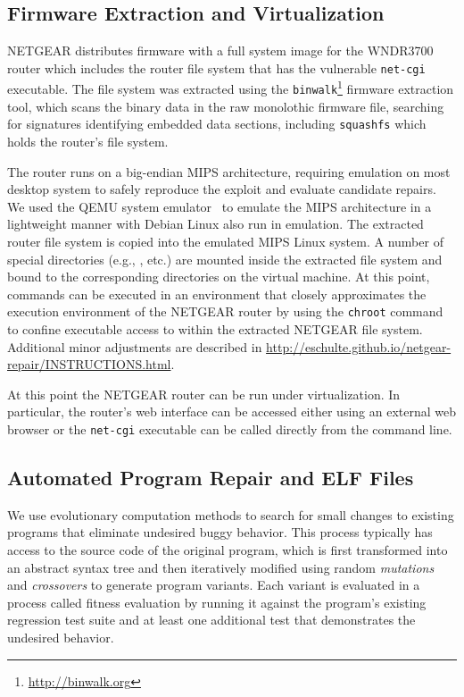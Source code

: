 \documentclass{sigcomm-alternate}
\begin{document}
\subsection{Firmware Extraction and Virtualization}
\label{sec-3-1}
NETGEAR distributes firmware with a full system image for the
WNDR3700 router which includes the router file system that has the
vulnerable \texttt{net-cgi} executable. 
The file system was extracted using the 
\texttt{binwalk}\footnote{\url{http://binwalk.org}} firmware extraction
tool, which scans the binary data in the raw monolothic firmware file,
searching for signatures
identifying embedded data sections,
including {\tt squashfs}\cite{lougher2006squashfs} which
holds the router's file system.

The router runs on a big-endian MIPS architecture, requiring emulation
on most desktop system to safely reproduce the exploit and evaluate
candidate repairs. We used the QEMU system
emulator~\cite{bellard2005qemu} to emulate the MIPS architecture in a
lightweight manner with Debian Linux also run in
emulation.  The extracted router file system is copied into the
emulated MIPS Linux system.  A number of special directories (e.g.,
,  etc.) are mounted inside the extracted
file system and bound to the corresponding directories on the virtual
machine.  At this point, commands can be executed in an environment
that closely approximates the execution environment of the NETGEAR
router by using the \texttt{chroot} command to confine executable access
to within the extracted NETGEAR file system. Additional minor
adjustments are described in \url{http://eschulte.github.io/netgear-repair/INSTRUCTIONS.html}.

At this point the NETGEAR router can be run under virtualization.  In
particular, the router's web interface can be accessed either using an
external web browser or the \texttt{net-cgi} executable can be called
directly from the command line.

\subsection{Automated Program Repair and ELF Files}
\label{sec-3-2}

We use evolutionary computation methods
\cite{forrest2009genetic,genprog-tse-journal,le2012representations,legoues2011systematicstudy}
to search for small changes to existing programs that eliminate
undesired buggy behavior.  This process typically has access to the
source code of the original program, which is first transformed into
an abstract syntax tree and then iteratively modified using random
\emph{mutations} and \emph{crossovers} to generate program variants.
Each variant is evaluated in a process called fitness evaluation by
running it against the program's existing regression test suite and at
least one additional test that demonstrates the undesired behavior.
\end{document}
